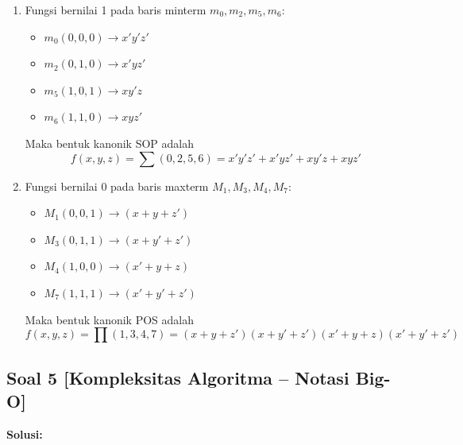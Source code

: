 \documentclass[12pt,a4paper]{article}
\begin{document}
\begin{enumerate}[label=(\alph*)]
    \item Fungsi bernilai 1 pada baris minterm $m_0, m_2, m_5, m_6$:
    \begin{itemize}
        \item $m_0 (0,0,0) \rightarrow x'y'z'$
        \item $m_2 (0,1,0) \rightarrow x'yz'$
        \item $m_5 (1,0,1) \rightarrow xy'z$
        \item $m_6 (1,1,0) \rightarrow xyz'$
    \end{itemize}
    Maka bentuk kanonik SOP adalah
    \[ f(x, y, z) = \sum(0, 2, 5, 6) = x'y'z' + x'yz' + xy'z + xyz' \]

    \item Fungsi bernilai 0 pada baris maxterm $M_1, M_3, M_4, M_7$:
    \begin{itemize}
        \item $M_1 (0,0,1) \rightarrow (x + y + z')$
        \item $M_3 (0,1,1) \rightarrow (x + y' + z')$
        \item $M_4 (1,0,0) \rightarrow (x' + y + z)$
        \item $M_7 (1,1,1) \rightarrow (x' + y' + z')$
    \end{itemize}
    Maka bentuk kanonik POS adalah
    \[ f(x, y, z) = \prod(1, 3, 4, 7) = (x + y + z')(x + y' + z')(x' + y + z)(x' + y' + z') \]
\end{enumerate}

\subsection*{Soal 5 [Kompleksitas Algoritma -- Notasi Big-O]}
\textbf{Solusi:}
\end{document}
